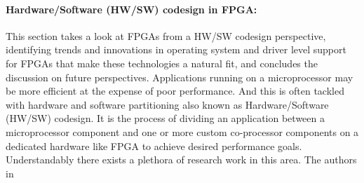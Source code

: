 \paragraph{Hardware/Software (HW/SW) codesign in FPGA:} 
This section takes a look at FPGAs from a
HW/SW codesign perspective, identifying trends and innovations in operating system and driver level support for FPGAs that make these technologies a natural fit, and concludes the discussion on future perspectives. Applications running on a microprocessor may be more efficient at the expense of poor performance. And this is often tackled with hardware and software partitioning also known as Hardware/Software (HW/SW) codesign. It is the process of dividing an application between a microprocessor component and one or more custom co-processor components on a dedicated hardware like FPGA to achieve desired performance goals. Understandably there exists a plethora of research work in this area. The authors in \cite{rfu} 
